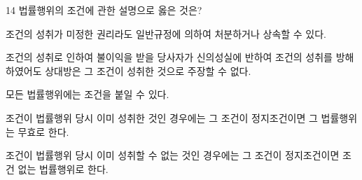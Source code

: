 \begin{question}{14}
법률행위의 조건에 관한 설명으로 옳은 것은?
\begin{choices}
  \item 조건의 성취가 미정한 권리라도 일반규정에 의하여 처분하거나 상속할 수 있다.
  \item 조건의 성취로 인하여 불이익을 받을 당사자가 신의성실에 반하여 조건의 성취를 방해하였어도 상대방은 그 조건이 성취한 것으로 주장할 수 없다.
  \item 모든 법률행위에는 조건을 붙일 수 있다.
  \item 조건이 법률행위 당시 이미 성취한 것인 경우에는 그 조건이 정지조건이면 그 법률행위는 무효로 한다.
  \item 조건이 법률행위 당시 이미 성취할 수 없는 것인 경우에는 그 조건이 정지조건이면 조건 없는 법률행위로 한다.
\end{choices}
\end{question}
